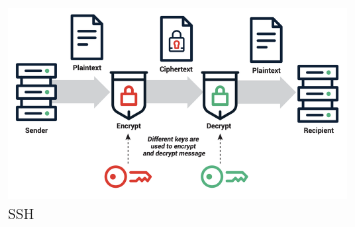 \begin{figure}
    \centering
    \includegraphics[width=0.8\textwidth]{assets/ssh.png}
    \caption{SSH}
    \label{fig:ssh}
\end{figure}

    
